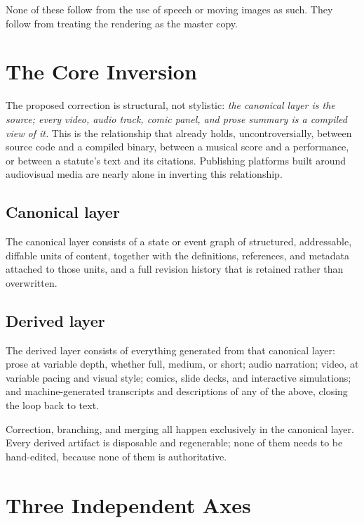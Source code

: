 \documentclass[11pt]{article}
\theoremstyle{definition}
\begin{document}
None of these follow from the use of speech or moving images as such. They follow from treating the rendering as the master copy.

\section{The Core Inversion}
\label{sec:core-inversion}

The proposed correction is structural, not stylistic: \emph{the canonical layer is the source; every video, audio track, comic panel, and prose summary is a compiled view of it.} This is the relationship that already holds, uncontroversially, between source code and a compiled binary, between a musical score and a performance, or between a statute's text and its citations. Publishing platforms built around audiovisual media are nearly alone in inverting this relationship.

\subsection{Canonical layer}

The canonical layer consists of a state or event graph of structured, addressable, diffable units of content, together with the definitions, references, and metadata attached to those units, and a full revision history that is retained rather than overwritten.

\subsection{Derived layer}

The derived layer consists of everything generated from that canonical layer: prose at variable depth, whether full, medium, or short; audio narration; video, at variable pacing and visual style; comics, slide decks, and interactive simulations; and machine-generated transcripts and descriptions of any of the above, closing the loop back to text.

Correction, branching, and merging all happen exclusively in the canonical layer. Every derived artifact is disposable and regenerable; none of them needs to be hand-edited, because none of them is authoritative.

\section{Three Independent Axes}
\label{sec:three-axes}
\end{document}
